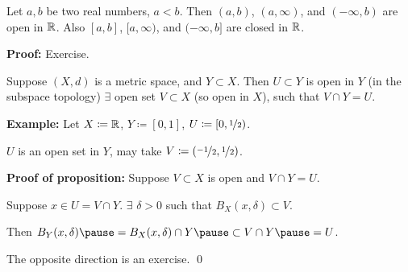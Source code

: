 \documentclass[10pt,aspectratio=149]{beamer}
\begin{document}
\begin{frame}

\begin{proposition}
Let $a, b$ be two real numbers, $a < b$.
\pause
Then $(a,b)$, $(a,\infty)$,
and $(-\infty,b)$ are open in ${\mathbb{R}}$.
\pause
Also $[a,b]$, $[a,\infty)$,
and $(-\infty,b]$ are closed in ${\mathbb{R}}$.
\end{proposition}

\pause
\textbf{Proof:} Exercise.

\pause
\begin{proposition}
Suppose $(X,d)$ is a metric space, and $Y \subset X$.
\pause
Then $U \subset Y$
is open in $Y$ (in the subspace topology) \wiffif
$\exists$ open set $V \subset X$ (so open in $X$), such that
$V \cap Y = U$.
\end{proposition}

\pause
\textbf{Example:}
Let $X \coloneqq {\mathbb{R}}$, $Y \coloneqq [0,1]$, $U \coloneqq [0,\nicefrac{1}{2})$.

\pause
$U$ is an open set in $Y$, may take $V \coloneqq (\nicefrac{-1}{2},\nicefrac{1}{2})$.

\pause
\medskip

\textbf{Proof of proposition:}
Suppose $V \subset X$ is open
\pause
and $V \cap Y = U$.

\pause
Suppose $x \in U = V \cap Y$.
\pause
\quad
$\exists$ $\delta > 0$ such that $B_X(x,\delta) \subset V$.

\pause
\medskip

Then
$
B_Y(x,\delta)
\pause
= B_X(x,\delta) \cap Y
\pause
\subset V \cap Y
\pause
= U$.

\pause
\medskip

The opposite direction is an exercise.
\qed


\end{frame}
\end{document}
